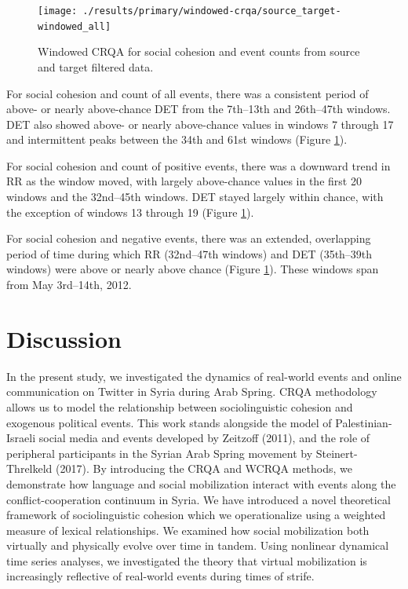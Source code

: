 \documentclass[
  english,
  man]{apa6}
\begin{document}
\begin{figure}
\texttt{[image: ./results/primary/windowed-crqa/source\_target-windowed\_all]} \caption{Windowed CRQA for social cohesion and event counts from source and target filtered data.}\label{fig:plot-wcrqa-source-targ-all}
\end{figure}

For social cohesion and count of all events, there was a consistent period of
above- or nearly above-chance DET from the 7th--13th and 26th--47th windows. DET
also showed above- or nearly above-chance values in windows 7 through 17 and
intermittent peaks between the 34th and 61st windows (Figure
\ref{fig:plot-wcrqa-source-targ-all}).

For social cohesion and count of positive events, there was a downward trend in
RR as the window moved, with largely above-chance values in the first 20 windows
and the 32nd--45th windows. DET stayed largely within chance, with the exception
of windows 13 through 19 (Figure \ref{fig:plot-wcrqa-source-targ-all}).

For social cohesion and negative events, there was an extended, overlapping
period of time during which RR (32nd--47th windows) and DET (35th--39th windows)
were above or nearly above chance (Figure
\ref{fig:plot-wcrqa-source-targ-all}). These windows span from May 3rd--14th,
2012.

\hypertarget{discussion}{%
\section{Discussion}\label{discussion}}

In the present study, we investigated the dynamics of real-world events and
online communication on Twitter in Syria during Arab Spring. CRQA methodology
allows us to model the relationship between sociolinguistic cohesion and
exogenous political events. This work stands alongside the model of
Palestinian-Israeli social media and events developed by Zeitzoff (2011), and
the role of peripheral participants in the Syrian Arab Spring movement by
Steinert-Threlkeld (2017). By introducing the CRQA and WCRQA methods, we
demonstrate how language and social mobilization interact with events along the
conflict-cooperation continuum in Syria. We have introduced a novel theoretical
framework of sociolinguistic cohesion which we operationalize using a weighted
measure of lexical relationships. We examined how social mobilization both
virtually and physically evolve over time in tandem. Using nonlinear dynamical
time series analyses, we investigated the theory that virtual mobilization is
increasingly reflective of real-world events during times of strife.
\end{document}
